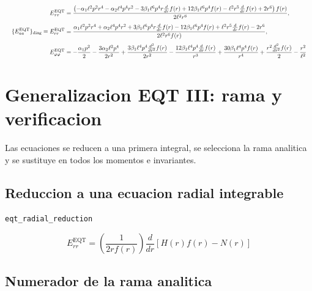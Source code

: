 \documentclass[11pt,a4paper]{article}
\begin{document}
\[
\resizebox{\textwidth}{!}{$\displaystyle \{E^{\mathrm{EQT}}_{aa}\}_{\mathrm{diag}} = \begin{aligned}&E^{\mathrm{EQT}}_{\tau\tau}=\frac{\left(- \alpha_{1} \ell^{2} p^{2} r^{4} - \alpha_{2} \ell^{4} p^{4} r^{2} - 3 \beta_{1} \ell^{6} p^{4} r \frac{d}{d r} f{\left(r \right)} + 12 \beta_{1} \ell^{6} p^{4} f{\left(r \right)} - \ell^{2} r^{5} \frac{d}{d r} f{\left(r \right)} + 2 r^{6}\right) f{\left(r \right)}}{2 \ell^{2} r^{6}},\\[4pt]&E^{\mathrm{EQT}}_{rr}=\frac{\alpha_{1} \ell^{2} p^{2} r^{4} + \alpha_{2} \ell^{4} p^{4} r^{2} + 3 \beta_{1} \ell^{6} p^{4} r \frac{d}{d r} f{\left(r \right)} - 12 \beta_{1} \ell^{6} p^{4} f{\left(r \right)} + \ell^{2} r^{5} \frac{d}{d r} f{\left(r \right)} - 2 r^{6}}{2 \ell^{2} r^{6} f{\left(r \right)}},\\[4pt]&E^{\mathrm{EQT}}_{\varphi\varphi}=- \frac{\alpha_{1} p^{2}}{2} - \frac{3 \alpha_{2} \ell^{2} p^{4}}{2 r^{2}} + \frac{3 \beta_{1} \ell^{4} p^{4} \frac{d^{2}}{d r^{2}} f{\left(r \right)}}{2 r^{2}} - \frac{12 \beta_{1} \ell^{4} p^{4} \frac{d}{d r} f{\left(r \right)}}{r^{3}} + \frac{30 \beta_{1} \ell^{4} p^{4} f{\left(r \right)}}{r^{4}} + \frac{r^{2} \frac{d^{2}}{d r^{2}} f{\left(r \right)}}{2} - \frac{r^{2}}{\ell^{2}}\end{aligned}$}
\]

\section{Generalizacion EQT III: rama y verificacion}

Las ecuaciones se reducen a una primera integral, se selecciona la rama analitica y se sustituye en todos los momentos e invariantes.

\subsection{Reduccion a una ecuacion radial integrable}

\noindent\texttt{eqt\_radial\_reduction}\par\nopagebreak[4]

\[
E^{\mathrm{EQT}}_{rr} = \left(\frac{1}{2 r f{\left(r \right)}}\right)\frac{d}{dr}[H(r)f(r)-N(r)]
\]

\subsection{Numerador de la rama analitica}
\end{document}
